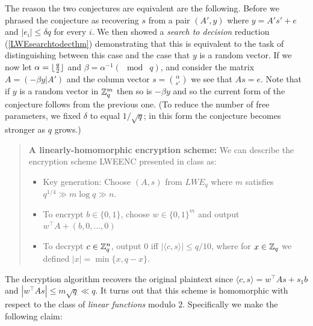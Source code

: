 The reason the two conjectures are equivalent are the following. Before
we phrased the conjecture as recovering \(s\) from a pair \((A',y)\)
where \(y=A's'+e\) and \(|e_i|\leq \delta q\) for every \(i\). We then
showed a \emph{search to decision} reduction (\cref{LWEsearchtodecthm})
demonstrating that this is equivalent to the task of distinguishing
between this case and the case that \(y\) is a random vector. If we now
let \(\alpha = \lfloor \tfrac{q}{2} \rfloor\) and
\(\beta = \alpha^{-1} (\mod\;q)\), and consider the matrix
\(A=(-\beta y|A')\) and the column vector \(s=\binom{\alpha}{s'}\) we
see that \(As = e\). Note that if \(y\) is a random vector in \({\mathbb{Z}}_q^m\)
then so is \(-\beta y\) and so the current form of the conjecture
follows from the previous one. (To reduce the number of free parameters,
we fixed \(\delta\) to equal \(1/\sqrt{q}\); in this form the conjecture
becomes stronger as \(q\) grows.)

\begin{quote}
\textbf{A linearly-homomorphic encryption scheme:} We can describe the
encryption scheme LWEENC presented in class as:

\begin{itemize}
\item
  Key generation: Choose \((A,s)\) from \(\ensuremath{\mathit{LWE}}_q\)
  where \(m\) satisfies \(q^{1/4} \gg m \log q \gg n\).
\item
  To encrypt \(b\in\{0,1\}\), choose \(w\in\{0,1\}^m\) and output
  \(w^\top A + (b,0,\ldots,0)\)
\item
  To decrypt \(c\in{\mathbb{Z}}_q^n\), output \(0\) iff
  \(|\langle c,s \rangle| \leq q/10\), where for \(x\in{\mathbb{Z}}_q\) we defined
  \(|x| = \min \{ x , q-x \}\).
\end{itemize}
\end{quote}

The decryption algorithm recovers the original plaintext since
\(\langle c,s \rangle= w^\top A s + s_1 b\) and
\(|w^\top A s| \leq m\sqrt{q} \ll q\). It turns out that this scheme is
homomorphic with respect to the class of \emph{linear functions} modulo
\(2\). Specifically we make the following claim:

\hypertarget{parityhomlem}{}

